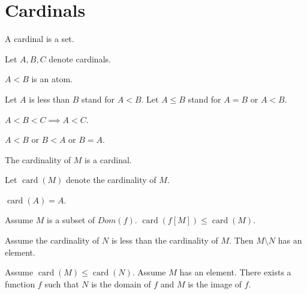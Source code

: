 \documentclass{article}
\newcommand{\card}[1]{\operatorname{card}(#1)}
\begin{document}
  \section{Cardinals}

\begin{forthel}
    \begin{signature}
      A cardinal is a set.
    \end{signature}

    Let $A,B,C$ denote cardinals.
    \begin{signature}
      $A < B$ is an atom.
    \end{signature}

    Let $A$ is less than $B$ stand for $A < B$.
    Let $A \leq B$ stand for $A = B$ or $A < B$.

    \begin{axiom}
      $A < B < C \implies A < C$.
    \end{axiom}

    \begin{axiom}
      $A < B$ or $B < A$ or $B = A$.
    \end{axiom}

    \begin{signature}
      The cardinality of $M$ is a cardinal.
    \end{signature}

    Let $\card{M}$ denote the cardinality of $M$.

    \begin{axiom}
      $\card{A} = A$.
    \end{axiom}

    \begin{axiom}[ImageCard]
      Assume $M$ is a subset of $Dom(f)$. $\card{f[M]} \leq \card{M}$.
    \end{axiom}

    \begin{axiom}
      Assume the cardinality of $N$ is less than the cardinality of $M$.
Then $M \setminus N$ has an element.
    \end{axiom}

    \begin{axiom}[SurjExi]
      Assume $\card{M} \leq \card{N}$. Assume $M$ has an element. There exists a
      function $f$ such that $N$ is the domain of $f$ and $M$ is the image of $f$.
    \end{axiom}

\end{forthel}
\end{document}
